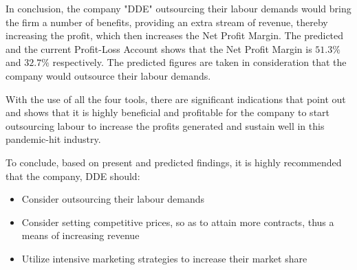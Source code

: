 {In conclusion, the company "DDE" outsourcing their labour demands would bring the firm a number of benefits, providing an extra stream of revenue, thereby increasing the profit, which then increases the Net Profit Margin. The predicted and the current Profit-Loss Account shows that the Net Profit Margin is $51.3\%$ and $32.7\%$ respectively. The predicted figures are taken in consideration that the company would outsource their labour demands.}

{With the use of all the four tools, there are significant indications that point out and shows that it is highly beneficial and profitable for the company to start outsourcing labour to increase the profits generated and sustain well in this pandemic-hit industry.}

{To conclude, based on present and predicted findings, it is highly recommended that the company, DDE should:}

    \begin{itemize}
        \item {Consider outsourcing their labour demands}
        \item {Consider setting competitive prices, so as to attain more contracts, thus a means of increasing revenue}
        \item {Utilize intensive marketing strategies to increase their market share}
    \end{itemize}

